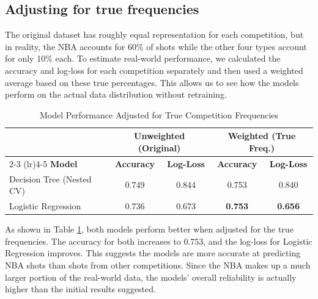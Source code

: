\documentclass[11pt, a4paper]{article}
\begin{document}
\subsection{Adjusting for true frequencies}
The original dataset has roughly equal representation for each competition, but in reality, the NBA accounts for 60\% of shots while the other four types account for only 10\% each. To estimate real-world performance, we calculated the accuracy and log-loss for each competition separately and then used a weighted average based on these true percentages. This allows us to see how the models perform on the actual data distribution without retraining.
\begin{table}[htpb]
    \centering
    \caption{Model Performance Adjusted for True Competition Frequencies}
    \label{tab:reweighted_metrics}
    \begin{tabular}{lcccc}
        \toprule
        & \multicolumn{2}{c}{\textbf{Unweighted (Original)}} & \multicolumn{2}{c}{\textbf{Weighted (True Freq.)}} \\
        \cmidrule(lr){2-3} \cmidrule(lr){4-5}
        \textbf{Model} & \textbf{Accuracy} & \textbf{Log-Loss} & \textbf{Accuracy} & \textbf{Log-Loss} \\
        \midrule
        Decision Tree (Nested CV) & 0.749 & 0.844 & 0.753 & 0.840 \\
        Logistic Regression & 0.736 & 0.673 & \textbf{0.753} & \textbf{0.656} \\
        \bottomrule
    \end{tabular}
\end{table}
As shown in Table \ref{tab:reweighted_metrics}, both models perform better when adjusted for the true frequencies. The accuracy for both increases to 0.753, and the log-loss for Logistic Regression improves. This suggests the models are more accurate at predicting NBA shots than shots from other competitions. Since the NBA makes up a much larger portion of the real-world data, the models' overall reliability is actually higher than the initial results suggested.
\end{document}
